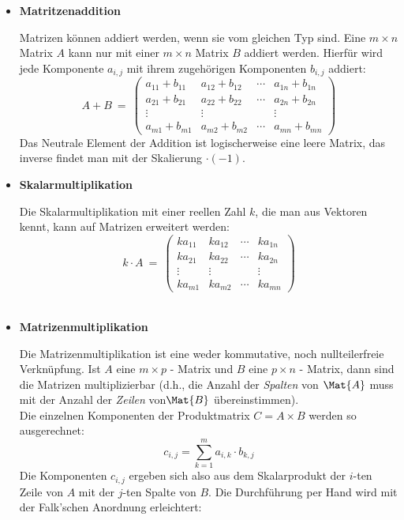 \documentclass[../MAIN/main.tex]{subfiles}
\begin{document}
\begin{itemize}

\item{\textbf{Matritzenaddition}}

Matrizen können addiert werden, wenn sie vom gleichen Typ sind. Eine $m\times n$ Matrix $A$ kann nur mit einer $m\times n$ Matrix $B$ addiert werden. Hierfür wird jede Komponente $a_{i,j}$ mit ihrem zugehörigen Komponenten $b_{i,j}$ addiert:
$$A + B \ = \  \left(
    \begin{array}{cccc}
        a_{11}+ b_{11} & a_{12}+ b_{12} &
            \cdots & a_{1n}+ b_{1n} \\
        a_{21}+ b_{21} & a_{22}+ b_{22} &
            \cdots & a_{2n}+ b_{2n} \\
        \vdots & \vdots &  & \vdots \\
        a_{m1}+ b_{m1} & a_{m2}+ b_{m2} &
            \cdots & a_{mn}+ b_{mn}
    \end{array}
    \right)$$
Das Neutrale Element der Addition ist logischerweise eine leere Matrix, das inverse findet man mit der Skalierung $\cdot (-1)$.\\

\item{\textbf{Skalarmultiplikation}}

Die Skalarmultiplikation mit einer reellen Zahl $k$, die man aus Vektoren kennt, kann auf Matrizen erweitert werden:
$$k\cdot A \ = \ \left(
    \begin{array}{cccc}
        k a_{11} & k a_{12} & \cdots & k a_{1n} \\
        k a_{21} & k a_{22} & \cdots & k a_{2n} \\
        \vdots & \vdots &  & \vdots \\
        k a_{m1} & k a_{m2} & \cdots & k a_{mn}
    \end{array}
    \right) $$\\

\item{\textbf{Matrizenmultiplikation}}

Die Matrizenmultiplikation ist eine weder kommutative, noch nullteilerfreie Verknüpfung. Ist $A$ eine $m\times p$ - Matrix und $B$ eine $p\times n$ - Matrix, dann sind die Matrizen multiplizierbar (d.h., die Anzahl der \textit{Spalten}
von $\Mat{A}$ muss mit der Anzahl der \textit{Zeilen} von$\Mat{B}$ übereinstimmen).\\
Die einzelnen Komponenten der Produktmatrix $C = A \times B$ werden so ausgerechnet:
  $$c_{i,j} = \sum_{k=1}^{m} a_{i,k} \cdot b_{k,j}$$
Die Komponenten $c_{i,j}$ ergeben sich also aus dem Skalarprodukt der $i$-ten Zeile von $A$ mit der $j$-ten Spalte von $B$. Die Durchführung per Hand wird mit der Falk'schen Anordnung erleichtert:


\end{itemize}
\end{document}
